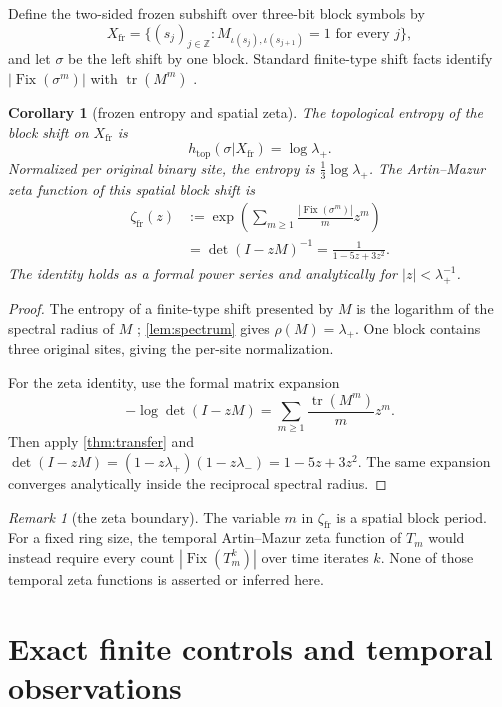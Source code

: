 \documentclass[11pt,a4paper]{amsart}
\newtheorem{corollary}[theorem]{Corollary}
\theoremstyle{definition}
\theoremstyle{remark}
\newtheorem{remark}[theorem]{Remark}
\newcommand{\Fix}{\operatorname{Fix}}
\newcommand{\tr}{\operatorname{tr}}
\newcommand{\Xfr}{X_{\mathrm{fr}}}
\begin{document}
Define the two-sided frozen subshift over three-bit block symbols by
\[
 \Xfr=\{(s_j)_{j\in\mathbb Z}:M_{\iota(s_j),\iota(s_{j+1})}=1
 \text{ for every }j\},
\]
and let $\sigma$ be the left shift by one block.  Standard finite-type shift
facts identify $|\Fix(\sigma^m)|$ with $\tr(M^m)$
\cite{LindMarcus1995}.

\begin{corollary}[frozen entropy and spatial zeta]\label{cor:spatial-zeta}
The topological entropy of the block shift on $\Xfr$ is
\[
 h_{\mathrm{top}}(\sigma|\Xfr)=\log\lambda_+.
\]
Normalized per original binary site, the entropy is
$\frac13\log\lambda_+$.  The Artin--Mazur zeta function of this
\emph{spatial block shift} is
\begin{align*}
 \zeta_{\mathrm{fr}}(z)
 &:=\exp\left(\sum_{m\geq1}\frac{|\Fix(\sigma^m)|}{m}z^m\right)\\
 &=\det(I-zM)^{-1}
 =\frac{1}{1-5z+3z^2}.
\end{align*}
The identity holds as a formal power series and analytically for
$|z|<\lambda_+^{-1}$.
\end{corollary}

\begin{proof}
The entropy of a finite-type shift presented by $M$ is the logarithm of the
spectral radius of $M$ \cite{LindMarcus1995}; \cref{lem:spectrum} gives
$\rho(M)=\lambda_+$.  One block contains three original sites, giving the
per-site normalization.

For the zeta identity, use the formal matrix expansion
\[
 -\log\det(I-zM)=\sum_{m\geq1}\frac{\tr(M^m)}m z^m.
\]
Then apply \cref{thm:transfer} and
$\det(I-zM)=(1-z\lambda_+)(1-z\lambda_-)=1-5z+3z^2$.
The same expansion converges analytically inside the reciprocal spectral
radius.
\end{proof}

\begin{remark}[the zeta boundary]\label{rem:zeta-boundary}
The variable $m$ in $\zeta_{\mathrm{fr}}$ is a spatial block period.  For a
fixed ring size, the temporal Artin--Mazur zeta function of $T_m$ would
instead require every count $|\Fix(T_m^k)|$ over time iterates $k$.  None of
those temporal zeta functions is asserted or inferred here.
\end{remark}

\section{Exact finite controls and temporal observations}
\end{document}
